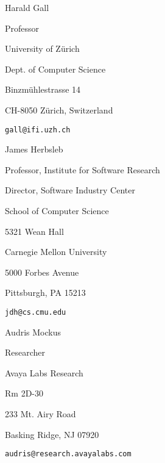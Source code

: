 \documentclass[margin,line,article,letterpaper]{res}
\newenvironment{list1}{
  \begin{list}{}{%
      \setlength{\itemsep}{0in}
      \setlength{\parsep}{0in} \setlength{\parskip}{0in}
      \setlength{\topsep}{0in} \setlength{\partopsep}{0in} 
      \setlength{\leftmargin}{0.17in}}}{\end{list}}
\begin{document}
\begin{resume}
Harald Gall
\begin{list1}
\item Professor
\item University of Z\"urich
\item Dept. of Computer Science
\item Binzm\"uhlestrasse 14
\item CH-8050 Z\"urich, Switzerland
\item \texttt{gall@ifi.uzh.ch}
\end{list1}

James Herbsleb
\begin{list1}
\item Professor, Institute for Software Research
\item Director, Software Industry Center
\item School of Computer Science
\item 5321 Wean Hall
\item Carnegie Mellon University
\item 5000 Forbes Avenue
\item Pittsburgh, PA 15213
\item \texttt{jdh@cs.cmu.edu}
\end{list1}

Audris Mockus
\begin{list1}
\item Researcher
\item Avaya Labs Research
\item Rm 2D-30
\item 233 Mt. Airy Road
\item Basking Ridge, NJ 07920
\item \texttt{audris@research.avayalabs.com}
\end{list1}

\end{resume}
\end{document}
